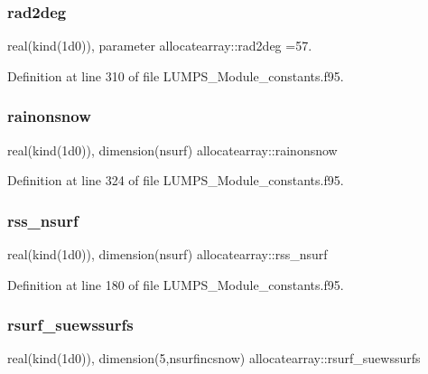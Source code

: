\subsubsection{\texorpdfstring{rad2deg}{rad2deg}}
{\footnotesize\ttfamily real(kind(1d0)), parameter allocatearray\+::rad2deg =57.}



Definition at line 310 of file L\+U\+M\+P\+S\+\_\+\+Module\+\_\+constants.\+f95.

\mbox{\label{namespaceallocatearray_a7cebe6a894aabf8474a3a9d98dada68d}} 
\subsubsection{\texorpdfstring{rainonsnow}{rainonsnow}}
{\footnotesize\ttfamily real(kind(1d0)), dimension(nsurf) allocatearray\+::rainonsnow}



Definition at line 324 of file L\+U\+M\+P\+S\+\_\+\+Module\+\_\+constants.\+f95.

\mbox{\label{namespaceallocatearray_ac0727c70a30d09ad8597e7b6456b619f}} 
\subsubsection{\texorpdfstring{rss\+\_\+nsurf}{rss\_nsurf}}
{\footnotesize\ttfamily real(kind(1d0)), dimension(nsurf) allocatearray\+::rss\+\_\+nsurf}



Definition at line 180 of file L\+U\+M\+P\+S\+\_\+\+Module\+\_\+constants.\+f95.

\mbox{\label{namespaceallocatearray_a9e55bcf0c5382bbe3fc4267c8f6869f3}} 
\subsubsection{\texorpdfstring{rsurf\+\_\+suewssurfs}{rsurf\_suewssurfs}}
{\footnotesize\ttfamily real(kind(1d0)), dimension(5,nsurfincsnow) allocatearray\+::rsurf\+\_\+suewssurfs}




